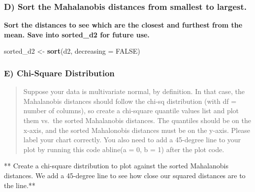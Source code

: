 \documentclass[
]{article}
\newenvironment{Shaded}{\begin{snugshade}}{\end{snugshade}}
\newcommand{\DataTypeTok}[1]{\textcolor[rgb]{0.13,0.29,0.53}{#1}}
\newcommand{\KeywordTok}[1]{\textcolor[rgb]{0.13,0.29,0.53}{\textbf{#1}}}
\newcommand{\NormalTok}[1]{#1}
\newcommand{\OtherTok}[1]{\textcolor[rgb]{0.56,0.35,0.01}{#1}}
\newcommand{\StringTok}[1]{\textcolor[rgb]{0.31,0.60,0.02}{#1}}
\begin{document}
\hypertarget{d-sort-the-mahalanobis-distances-from-smallest-to-largest.}{%
\subsubsection{D) Sort the Mahalanobis distances from smallest to
largest.}\label{d-sort-the-mahalanobis-distances-from-smallest-to-largest.}}

\textbf{Sort the distances to see which are the closest and furthest
from the mean. Save into sorted\_d2 for future use.}

\begin{Shaded}
\begin{Highlighting}[]
\NormalTok{sorted_d2 <-}\StringTok{ }\KeywordTok{sort}\NormalTok{(d2, }\DataTypeTok{decreasing =} \OtherTok{FALSE}\NormalTok{) }
\end{Highlighting}
\end{Shaded}

\hypertarget{e-chi-square-distribution}{%
\subsubsection{E) Chi-Square
Distribution}\label{e-chi-square-distribution}}

\begin{quote}
Suppose your data is multivariate normal, by definition. In that case,
the Mahalanobis distances should follow the chi-sq distribution (with df
= number of columns), so create a chi-square quantile values list and
plot them vs.~the sorted Mahalanobis distances. The quantiles should be
on the x-axis, and the sorted Mahalonobis distances must be on the
y-axis. Please label your chart correctly. You also need to add a
45-degree line to your plot by running this code abline(a = 0, b = 1)
after the plot code.
\end{quote}

** Create a chi-square distribution to plot against the sorted
Mahalanobis distances. We add a 45-degree line to see how close our
squared distances are to the line.**
\end{document}
